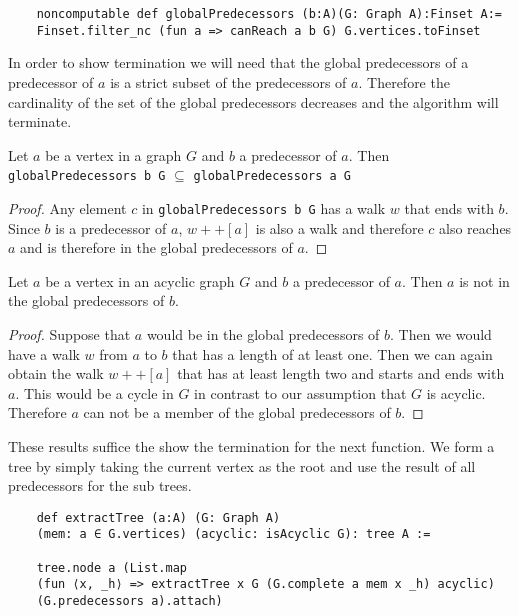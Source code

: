 \begin{lstlisting}
    noncomputable def globalPredecessors (b:A)(G: Graph A):Finset A:=
    Finset.filter_nc (fun a => canReach a b G) G.vertices.toFinset
\end{lstlisting}

In order to show termination we will need that the global predecessors of a predecessor of $a$ is a strict subset of the predecessors of $a$. Therefore the cardinality of the set of the global predecessors decreases and the algorithm will terminate.

\begin{lemma}
    Let $a$ be a vertex in a graph $G$ and $b$ a predecessor of $a$. Then \texttt{globalPredecessors b G} $\subseteq$ \texttt{globalPredecessors a G}
\end{lemma}
\begin{proof}
    Any element $c$ in \texttt{globalPredecessors b G} has a walk $w$ that ends with $b$. Since $b$ is a predecessor of $a$, $w++[a]$ is also a walk and therefore $c$ also reaches $a$ and is therefore in the global predecessors of $a$. 
\end{proof}

\begin{lemma}
    Let $a$ be a vertex in an acyclic graph $G$ and $b$ a predecessor of $a$.
    Then $a$ is not in the global predecessors of $b$.
\end{lemma}
\begin{proof}
    Suppose that $a$ would be in the global predecessors of $b$. Then we would have a walk $w$ from $a$ to $b$ that has a length of at least one. Then we can again obtain the walk $w++[a]$ that has at least length two and starts and ends with $a$. This would be a cycle in $G$ in contrast to our assumption that $G$ is acyclic. Therefore $a$ can not be a member of the global predecessors of $b$.
\end{proof}

These results suffice the show the termination for the next function. We form a tree by simply taking the current vertex as the root and use the result of all predecessors for the sub trees.

\begin{lstlisting}
    def extractTree (a:A) (G: Graph A) 
    (mem: a ∈ G.vertices) (acyclic: isAcyclic G): tree A :=

    tree.node a (List.map 
    (fun ⟨x, _h⟩ => extractTree x G (G.complete a mem x _h) acyclic) 
    (G.predecessors a).attach)
\end{lstlisting}

